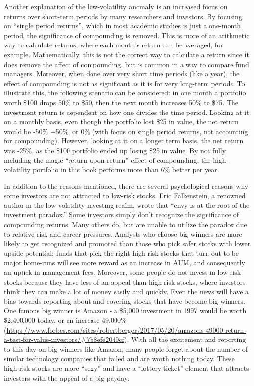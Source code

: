 \documentclass[12pt,twoside]{reedthesis}
\theoremstyle{definition}
\theoremstyle{definition}
\theoremstyle{definition}
\theoremstyle{remark}
\begin{document}
Another explanation of the low-volatility anomaly is an increased focus
on returns over short-term periods by many researchers and investors. By
focusing on ``single period returns'', which in most academic studies is
just a one-month period, the significance of compounding is removed.
This is more of an arithmetic way to calculate returns, where each
month's return can be averaged, for example. Mathematically, this is not
the correct way to calculate a return since it does remove the affect of
compounding, but is common in a way to compare fund managers. Moreover,
when done over very short time periods (like a year), the effect of
compounding is not as significant as it is for very long-term periods.
To illustrate this, the following scenario can be considered: in one
month a portfolio worth \$100 drops 50\% to \$50, then the next month
increases 50\% to \$75. The investment return is dependent on how one
divides the time period. Looking at it on a monthly basis, even though
the portfolio lost \$25 in value, the net return would be -50\% +50\%,
or 0\% (with focus on single period returns, not accounting for
compounding). However, looking at it on a longer term basis, the net
return was -25\%, as the \$100 portfolio ended up losing \$25 in value.
By not fully including the magic ``return upon return'' effect of
compounding, the high-volatility portfolio in this book performs more
than 6\% better per year.

In addition to the reasons mentioned, there are several psychological
reasons why some investors are not attracted to low-risk stocks. Eric
Falkenstein, a renowned author in the low volatility investing realm,
wrote that ``envy is at the root of the investment paradox.'' Some
investors simply don't recognize the significance of compounding
returns. Many others do, but are unable to utilize the paradox due to
relative risk and career pressures. Analysts who choose big winners are
more likely to get recognized and promoted than those who pick safer
stocks with lower upside potential; funds that pick the right high risk
stocks that turn out to be major home-runs will see more reward as an
increase in AUM, and consequently an uptick in management fees.
Moreover, some people do not invest in low risk stocks because they have
less of an appeal than high risk stocks, where investors think they can
make a lot of money easily and quickly. Even the news will have a bias
towards reporting about and covering stocks that have become big
winners. One famous big winner is Amazon - a \$5,000 investment in 1997
would be worth \$2,400,000 today, or an increase 49,000\%
(\url{https://www.forbes.com/sites/robertberger/2017/05/20/amazons-49000-return-a-test-for-value-investors/\#7b8efe2049cf}).
With all the excitement and reporting to this day on big winners like
Amazon, many people forget about the number of similar technology
companies that failed and are worth nothing today. These high-risk
stocks are more ``sexy'' and have a ``lottery ticket'' element that
attracts investors with the appeal of a big payday.
\end{document}
